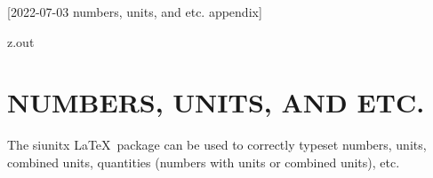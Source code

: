[2022-07-03 numbers, units, and etc. appendix]

%

\newcommand{\pkg}[1]{\textsf{#1}}

\begin{VerbatimOut}{z.out}
\chapter{NUMBERS, UNITS, AND ETC.}

The \pkg{siunitx} \LaTeX\ package
\cite{wright2022}
can be used
to correctly typeset
numbers,
units,
combined units,
quantities (numbers with units or combined units),
etc.
\end{VerbatimOut}

\MyIO


